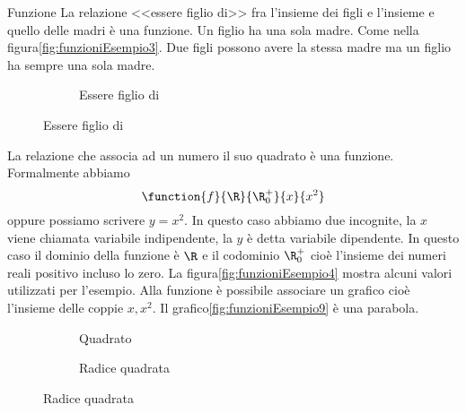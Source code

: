 \begin{osservazionet}{Funzione}{}
La relazione <<essere figlio di>> fra l'insieme dei figli e l'insieme e quello delle madri è una funzione. Un figlio ha una sola madre. Come nella figura\nobs\vref{fig:funzioniEsempio3}. Due figli possono avere la stessa madre ma un figlio ha sempre una sola madre.
\end{osservazionet}
\begin{figure}
	\centering
	\begin{subfigure}[b]{.4\linewidth}
		\centering
		
		\caption{Essere figlio di}
		\label{fig:funzioniEsempio3}
	\end{subfigure}\qquad
\end{figure}
\begin{osservazionet}{}{}
La relazione che associa ad un numero il suo quadrato è una funzione. Formalmente abbiamo \[\function{f}{\R}{\R^{+}_{0}}{x}{x^2} \] oppure possiamo scrivere $y=x^2$. In questo caso abbiamo due incognite, la $x$ viene chiamata variabile indipendente, la $y$ è detta variabile dipendente. In questo caso il dominio della funzione è $\R$ e il codominio $\R^{+}_{0}$ cioè l'insieme dei numeri reali positivo incluso lo zero. La figura\nobs\vref{fig:funzioniEsempio4} mostra alcuni valori utilizzati per l'esempio. Alla funzione è possibile associare un grafico cioè l'insieme delle coppie $x,x^2$. Il grafico\nobs\vref{fig:funzioniEsempio9} è una parabola. 
\end{osservazionet}
\begin{figure}
	\centering
	\begin{subfigure}[b]{.4\linewidth}
		\centering
		
		\caption{Quadrato}
		\label{fig:funzioniEsempio4}
	\end{subfigure}\qquad
	\centering
	\begin{subfigure}[b]{.4\linewidth}
		\centering
		
		\caption{Radice quadrata}
		\label{fig:funzioniEsempio5}
	\end{subfigure}%
\end{figure}
